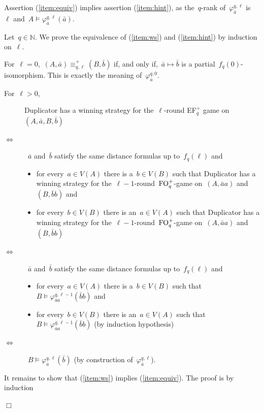 \documentclass[11pt]{article}
\numberwithin{equation}{section}
\newcommand{\N}{{\mathbb N}} \newcommand{\Q}{{\mathbb Q}}
\newcommand{\FO}{\textup{FO}}
\renewcommand{\phi}{\varphi}
\newcommand{\tup}[1]{\bar{#1}}
\def\qed{\hspace*{\fill}$\Box$}
\newenvironment{proof}[1][]%
{\ifthenelse{\equal{#1}{}}{\noindent\textit{Proof.
    }}{\noindent\textit{#1. }}}%
{\qed\par\smallskip}
\begin{document}
\begin{proof}
  Assertion (\ref{item:equiv}) implies assertion (\ref{item:hint}), as
  the~$q$-rank of~$\phi_{\tup{a}}^{q,{\ell}}$ is~${\ell}$
  and~$A\models\phi_{\tup{a}}^{q,{\ell}}(\tup{a})$.

  Let~$q\in \N$. We prove the equivalence of (\ref{item:ws}) and
  (\ref{item:hint}) by induction on~${\ell}$.

  For~${\ell}=0$,~$(A,\tup a)\equiv^+_{q,{\ell}} (B,\tup b)$ if, and
  only if,~$\tup a\mapsto \tup b$ is a
  partial~$f_q(0)$-isomorphism. This is exactly the meaning
  of~$\phi_{\tup{a}}^{q,0}$.

  For~${\ell}>0$, 
  \begin{description}
  \item[] Duplicator has a winning strategy for the~${\ell}$-round
    EF$_q^+$ game on~$(A,\tup{a},B, \tup{b})$
    \item[$\Longleftrightarrow$] ~$\tup{a}$ and~$\tup{b}$ satisfy the same
    distance formulas up to~$f_q({\ell})$ and
    \begin{itemize}
    \item for every~$a\in V(A)$ there is a~$b\in V(B)$ such that
      Duplicator has a winning strategy for
      the~${\ell}-1$-round~$\FO_q^+$-game on~$(A, \tup{a}a)$
      and~$(B,\tup{b}b)$ and
    \item for every~$b\in V(B)$ there is an~$a\in V(A)$ such that
      Duplicator has a winning strategy for
      the~${\ell}-1$-round~$\FO_q^+$-game on~$(A, \tup{a}a)$
      and~$(B,\tup{b}b)$
    \end{itemize}
   \item[$\Longleftrightarrow$] ~$\tup{a}$ and~$\tup{b}$ satisfy the same
    distance formulas up to~$f_q({\ell})$ and
    \begin{itemize}
    \item for every~$a\in V(A)$ there is a~$b\in V(B)$ such
      that~$B\models\phi_{\tup{a}a}^{q,{\ell}-1}(\tup{b}b)$ and
    \item for every~$b\in V(B)$ there is an~$a\in V(A)$ such
      that~$B\models\phi_{\tup{a}a}^{q,{\ell}-1}(\tup{b}b)$ (by
      induction hypothesis)
    \end{itemize} 
  \item[$\Longleftrightarrow$]~$B\models\phi_{\tup{a}}^{q,{\ell}}(\tup{b})$
    (by construction of~$\phi_{\tup{a}}^{q,{\ell}}$).
  \end{description}
  It remains to show that (\ref{item:ws}) implies
  (\ref{item:equiv}). The proof is by induction

\end{proof}
\end{document}
